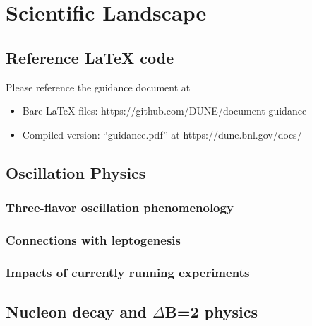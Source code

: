 \chapter{Scientific Landscape}
\label{ch:physics-atmpdk}

\section{Reference LaTeX code}

Please reference the guidance document at 

\begin{itemize}
\item Bare LaTeX files: https://github.com/DUNE/document-guidance
\item Compiled version: ``guidance.pdf'' at https://dune.bnl.gov/docs/
\end{itemize}



\section{Oscillation Physics}
\label{sec:landscape-osc}

\subsection{Three-flavor oscillation phenomenology}
\label{sec:landscape-osc-3flavor}

\subsection{Connections with leptogenesis} 
\label{sec:landscape-osc-leptogen}


\subsection{Impacts of currently running experiments}
\label{sec:landscape-osc-impacts}



\section{Nucleon decay and $\Delta$B=2 physics}
\label{sec:landscape-ndk}


